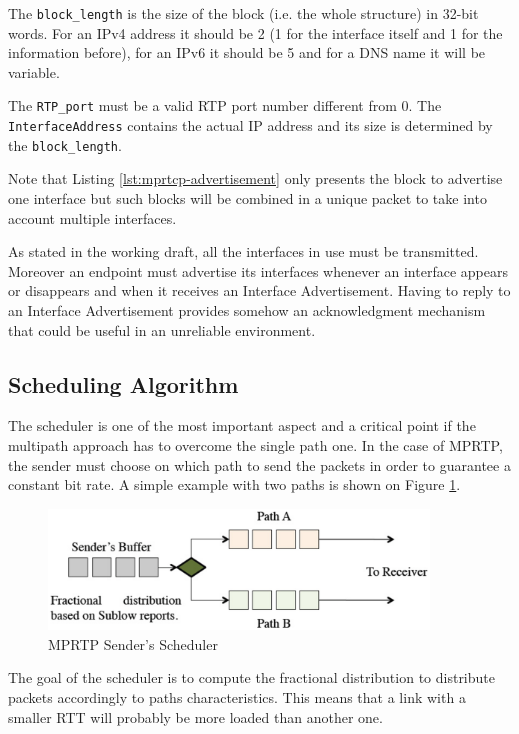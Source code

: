 The \texttt{block\_length} is the size of the block (i.e. the whole structure) in 32-bit words. For an IPv4 address it should be 2 (1 for the interface itself and 1 for the information before), for an IPv6 it should be 5 and for a DNS name it will be variable.

The \texttt{RTP\_port} must be a valid RTP port number different from 0. The \texttt{InterfaceAddress} contains the actual IP address and its size is determined by the \texttt{block\_length}.

Note that Listing \ref{lst:mprtcp-advertisement} only presents the block to advertise one interface but such blocks will be combined in a unique packet to take into account multiple interfaces.

As stated in the working draft, all the interfaces in use must be transmitted. Moreover an endpoint must advertise its interfaces whenever an interface appears or disappears and when it receives an Interface Advertisement. Having to reply to an Interface Advertisement provides somehow an acknowledgment mechanism that could be useful in an unreliable environment.

\subsection{Scheduling Algorithm}

The scheduler is one of the most important aspect and a critical point if the multipath approach has to overcome the single path one. In the case of MPRTP, the sender must choose on which path to send the packets in order to guarantee a constant bit rate. A simple example with two paths is shown on Figure \ref{fig:mprtp-scheduler}.

\begin{figure}[!ht]
\centering
\includegraphics[width=0.9\textwidth]{images/mprtp-scheduler}
\caption{MPRTP Sender's Scheduler}
\label{fig:mprtp-scheduler}
\end{figure}

The goal of the scheduler is to compute the fractional distribution to distribute packets accordingly to paths characteristics. This means that a link with a smaller RTT will probably be more loaded than another one.

